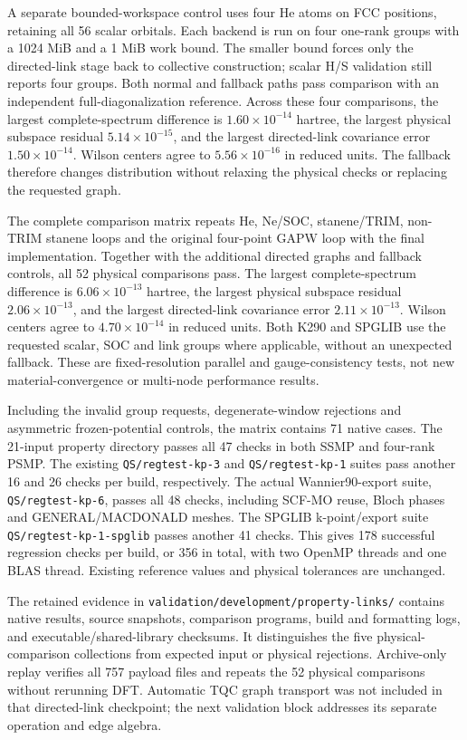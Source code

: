 \documentclass[11pt]{article}
\begin{document}
A separate bounded-workspace control uses four He atoms on FCC
positions, retaining all 56 scalar orbitals. Each backend is run
on four one-rank groups with a 1024 MiB and a 1 MiB work bound.
The smaller bound forces only the directed-link stage back to
collective construction; scalar H/S validation still reports four
groups. Both normal and fallback paths pass comparison with an
independent full-diagonalization reference. Across these four
comparisons, the largest complete-spectrum difference is
$1.60\times10^{-14}$ hartree, the largest physical subspace
residual $5.14\times10^{-15}$, and the largest directed-link
covariance error $1.50\times10^{-14}$. Wilson centers agree to
$5.56\times10^{-16}$ in reduced units. The fallback therefore
changes distribution without relaxing the physical checks or
replacing the requested graph.

The complete comparison matrix repeats He, Ne/SOC, stanene/TRIM,
non-TRIM stanene loops and the original four-point GAPW loop with
the final implementation. Together with the additional directed
graphs and fallback controls, all 52 physical comparisons pass.
The largest complete-spectrum difference is
$6.06\times10^{-13}$ hartree, the largest physical subspace
residual $2.06\times10^{-13}$, and the largest directed-link
covariance error $2.11\times10^{-13}$. Wilson centers agree to
$4.70\times10^{-14}$ in reduced units. Both K290 and SPGLIB
use the requested scalar, SOC and link groups where applicable, without an unexpected
fallback. These are fixed-resolution parallel and gauge-consistency
tests, not new material-convergence or multi-node performance results.

Including the invalid group requests, degenerate-window rejections
and asymmetric frozen-potential controls, the matrix contains
71 native cases. The 21-input property directory passes all
47 checks in both SSMP and four-rank PSMP. The existing
\texttt{QS/regtest-kp-3} and \texttt{QS/regtest-kp-1} suites
pass another 16 and 26 checks per build, respectively.
The actual Wannier90-export suite, \texttt{QS/regtest-kp-6},
passes all 48 checks, including SCF-MO reuse, Bloch phases and
GENERAL/MACDONALD meshes. The SPGLIB k-point/export suite
\texttt{QS/regtest-kp-1-spglib} passes another 41 checks.
This gives 178 successful regression checks per build, or 356
in total, with two OpenMP threads and one BLAS thread.
Existing reference values and physical tolerances are unchanged.

The retained evidence in
\nolinkurl{validation/development/property-links/}
contains native results, source snapshots, comparison programs,
build and formatting logs, and executable/shared-library checksums.
It distinguishes the five physical-comparison collections from
expected input or physical rejections. Archive-only replay verifies
all 757 payload files and repeats the 52 physical comparisons
without rerunning DFT. Automatic TQC graph transport
was not included in that directed-link checkpoint; the next
validation block addresses its separate operation and edge algebra.
\end{document}
